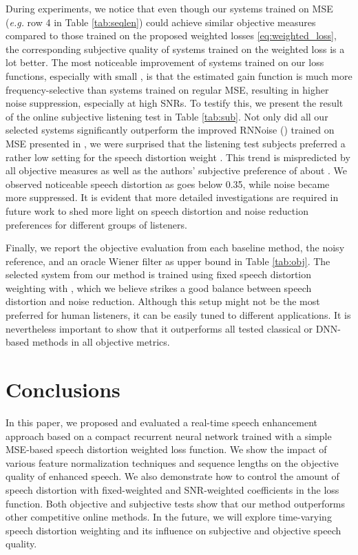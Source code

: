 \documentclass{article}
\begin{document}
During experiments, we notice that even though our systems trained on \ac{MSE} (\emph{e.g.} row 4 in Table \ref{tab:seqlen}) could achieve similar objective measures compared to those trained on the proposed weighted losses \eqref{eq:weighted_loss}, the corresponding subjective quality of systems trained on the weighted loss is a lot better. The most noticeable improvement of systems trained on our loss functions, especially with small , is that the estimated gain function is much more frequency-selective than systems trained on regular \ac{MSE}, resulting in higher noise suppression, especially at high SNRs. To testify this, we present the result of the online subjective listening test in Table \ref{tab:sub}. Not only did all our selected systems significantly outperform the improved RNNoise () trained on \ac{MSE} presented in \cite{Reddy2019}, we were surprised that the listening test subjects preferred a rather low setting for the speech distortion weight . This trend is mispredicted by all objective measures as well as the authors' subjective preference of about . We observed noticeable speech distortion as  goes below 0.35, while noise became more suppressed. It is evident that more detailed investigations are required in future work to shed more light on speech distortion and noise reduction preferences for different groups of listeners.

Finally, we report the objective evaluation from each baseline method, the noisy reference, and an oracle Wiener filter as upper bound in Table \ref{tab:obj}. The selected system from our method is trained using fixed speech distortion weighting with , which we believe strikes a good balance between speech distortion and noise reduction. Although this setup might not be the most preferred for human listeners, it can be easily tuned to different applications. It is nevertheless important to show that it outperforms all tested classical or DNN-based methods in all objective metrics.

\vspace{-2mm}
\section{Conclusions}
\vspace{-2mm}
\label{sec:con}
In this paper, we proposed and evaluated a real-time speech enhancement approach based on a compact recurrent neural network trained with a simple MSE-based speech distortion weighted loss function. We show the impact of various feature normalization techniques and sequence lengths on the objective quality of enhanced speech. We also demonstrate how to control the amount of speech distortion with fixed-weighted and SNR-weighted coefficients in the loss function. Both objective and subjective tests show that our method outperforms other competitive online methods. In the future, we will explore time-varying speech distortion weighting and its influence on subjective and objective speech quality.






\pagebreak



\end{document}
